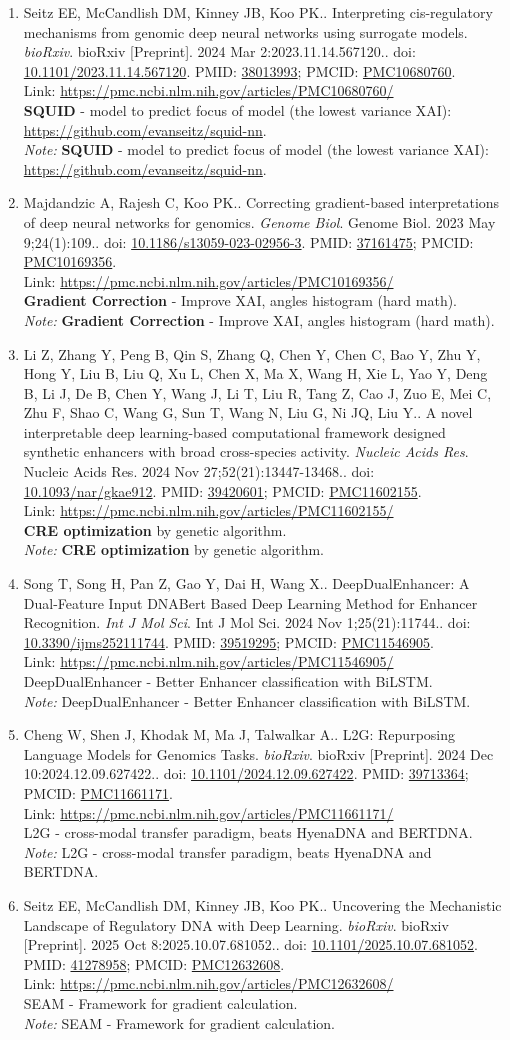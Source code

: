 \documentclass[12pt]{article}
\newcommand{\Pub}[9]{%
  \item #1. #2. \textit{#3}. #4. doi: \href{https://doi.org/#5}{#5}. PMID: \href{https://pubmed.ncbi.nlm.nih.gov/#6/}{#6}; PMCID: \href{https://www.ncbi.nlm.nih.gov/pmc/articles/#7/}{#7}. \\
  \noindent Link: \url{#8}\\
  \ifx#9\relax\else\\\textit{Note:} #9\fi
}
\begin{document}
\begin{enumerate}[leftmargin=*,label=\textbf{\arabic*.}]
\Pub{Seitz EE, McCandlish DM, Kinney JB, Koo PK.}{Interpreting cis-regulatory mechanisms from genomic deep neural networks using surrogate models}{bioRxiv}{bioRxiv [Preprint]. 2024 Mar 2:2023.11.14.567120.}{10.1101/2023.11.14.567120}{38013993}{PMC10680760}{https://pmc.ncbi.nlm.nih.gov/articles/PMC10680760/}{\textbf{SQUID} - model to predict focus of model (the lowest variance XAI): \url{https://github.com/evanseitz/squid-nn}.}

\Pub{Majdandzic A, Rajesh C, Koo PK.}{Correcting gradient-based interpretations of deep neural networks for genomics}{Genome Biol}{Genome Biol. 2023 May 9;24(1):109.}{10.1186/s13059-023-02956-3}{37161475}{PMC10169356}{https://pmc.ncbi.nlm.nih.gov/articles/PMC10169356/}{\textbf{Gradient Correction} - Improve XAI, angles histogram (hard math).}

\Pub{Li Z, Zhang Y, Peng B, Qin S, Zhang Q, Chen Y, Chen C, Bao Y, Zhu Y, Hong Y, Liu B, Liu Q, Xu L, Chen X, Ma X, Wang H, Xie L, Yao Y, Deng B, Li J, De B, Chen Y, Wang J, Li T, Liu R, Tang Z, Cao J, Zuo E, Mei C, Zhu F, Shao C, Wang G, Sun T, Wang N, Liu G, Ni JQ, Liu Y.}{A novel interpretable deep learning-based computational framework designed synthetic enhancers with broad cross-species activity}{Nucleic Acids Res}{Nucleic Acids Res. 2024 Nov 27;52(21):13447-13468.}{10.1093/nar/gkae912}{39420601}{PMC11602155}{https://pmc.ncbi.nlm.nih.gov/articles/PMC11602155/}{\textbf{CRE optimization} by genetic algorithm.}

\Pub{Song T, Song H, Pan Z, Gao Y, Dai H, Wang X.}{DeepDualEnhancer: A Dual-Feature Input DNABert Based Deep Learning Method for Enhancer Recognition}{Int J Mol Sci}{Int J Mol Sci. 2024 Nov 1;25(21):11744.}{10.3390/ijms252111744}{39519295}{PMC11546905}{https://pmc.ncbi.nlm.nih.gov/articles/PMC11546905/}{DeepDualEnhancer - Better Enhancer classification with BiLSTM.}

\Pub{Cheng W, Shen J, Khodak M, Ma J, Talwalkar A.}{L2G: Repurposing Language Models for Genomics Tasks}{bioRxiv}{bioRxiv [Preprint]. 2024 Dec 10:2024.12.09.627422.}{10.1101/2024.12.09.627422}{39713364}{PMC11661171}{https://pmc.ncbi.nlm.nih.gov/articles/PMC11661171/}{L2G - cross-modal transfer paradigm, beats HyenaDNA and BERTDNA.}

\Pub{Seitz EE, McCandlish DM, Kinney JB, Koo PK.}{Uncovering the Mechanistic Landscape of Regulatory DNA with Deep Learning}{bioRxiv}{bioRxiv [Preprint]. 2025 Oct 8:2025.10.07.681052.}{10.1101/2025.10.07.681052}{41278958}{PMC12632608}{https://pmc.ncbi.nlm.nih.gov/articles/PMC12632608/}{SEAM - Framework for gradient calculation.}


\end{enumerate}
\end{document}
